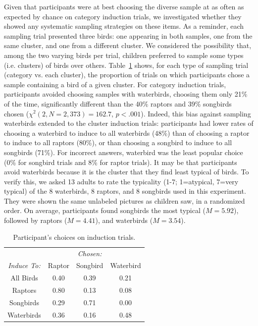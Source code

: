 \documentclass[10pt,letterpaper]{article}
\begin{document}
Given that participants were at best choosing the diverse sample at as often as expected by chance on category induction trials, we investigated whether they showed any systematic sampling strategies on these items. 
As a reminder, each sampling trial presented three birds: one appearing in both samples, one from the same cluster, and one from a different cluster. 
We considered the possibility that, among the two varying birds per trial, children preferred to sample some types (i.e. clusters) of birds over others.
Table~\ref{tab:choices} shows, for each type of sampling trial (category vs. each cluster), the proportion of trials on which participants chose a sample containing a bird of a given cluster.
For category induction trials, participants avoided choosing samples with waterbirds, choosing them only 21\% of the time, significantly different than the 40\% raptors and 39\% songbirds chosen ($\chi^2(2, N=2,373) = 162.7$, $p<.001$).
Indeed, this bias against sampling waterbirds extended to the cluster induction trials: participants had lower rates of choosing a waterbird to induce to all waterbirds (48\%) than of choosing a raptor to induce to all raptors (80\%), or than choosing a songbird to induce to all songbirds (71\%).
For incorrect answers, waterbird was the least popular choice (0\% for songbird trials and 8\% for raptor trials).
It may be that participants avoid waterbirds because it is the cluster that they find least typical of birds. 
To verify this, we asked 13 adults to rate the typicality (1-7; 1=atypical, 7=very typical) of the 8 waterbirds, 8 raptors, and 8 songbirds used in this experiment. 
They were shown the same unlabeled pictures as children saw, in a randomized order. 
On average, participants found songbirds the most typical ($M=5.92$), followed by raptors ($M=4.41$), and waterbirds ($M=3.54$).

\begin{table}
\begin{center}
\begin{tabular}{ c|ccc } 
 \hline
          &  & {\em Chosen: }  & \\
{\em Induce To:} & Raptor & Songbird & Waterbird \\ \hline
All Birds &  0.40  &  0.39   &  0.21 \\ \hline
Raptors   &  0.80  &  0.13   &  0.08 \\
Songbirds &  0.29  &  0.71   &  0.00 \\
Waterbirds & 0.36  &  0.16   &  0.48 \\
 \hline
\end{tabular}
\end{center}
\caption{Participant's choices on induction trials.}
    \label{tab:choices}
\end{table}
\vspace{-.15cm}
\end{document}
